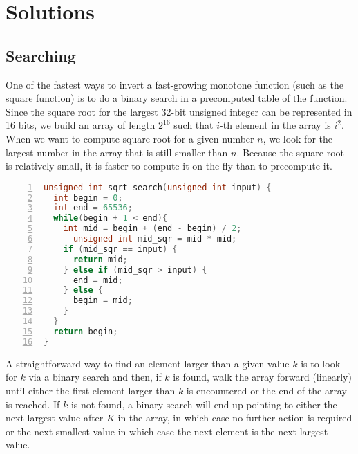 \part{Solutions}
\setcounter{chapter}{0}

{
\renewcommand{\chaptermark}[1]{
\ifthenelse{\boolean{kindle1}}{\makeoddhead{kindle1page}{\scriptsize{Ch.~\arabic{chapter}}}{\scriptsize \em Solutions}{\scriptsize #1} }{}
}
}


\chapter{ Searching}\normalsize


One of the fastest ways to invert a fast-growing monotone function (such as the square function) 
is to do a binary search in a precomputed table of the function. 
Since the square root for the largest 32-bit unsigned integer can be represented in 16 bits, we build an array of
length $2^{16}$ such that $i$-th element in the array is $i^2$. When
we want to compute square root for a given number $n$, we look for the
largest number in the array that is still smaller than $n$.  Because
the square root is relatively small, it is faster to compute it on the fly
than to precompute it.
\begin{lstlisting}[basicstyle=\footnotesize,numbers=left,breaklines=true,language=C++]
unsigned int sqrt_search(unsigned int input) {
  int begin = 0;
  int end = 65536;
  while(begin + 1 < end){
    int mid = begin + (end - begin) / 2;
      unsigned int mid_sqr = mid * mid;
    if (mid_sqr == input) {
      return mid;
    } else if (mid_sqr > input) {
      end = mid;
    } else {
      begin = mid;
    }
  }
  return begin;
}
\end{lstlisting}



A straightforward way to find an element larger than 
a given value $k$ is to look for $k$ via a 
binary search and then, if $k$ is found, walk the array 
forward (linearly) until either the first element 
larger than $k$ is encountered or the end of the array is reached. 
If $k$ is not found, a binary search will end up pointing to 
either the next largest value after $K$ in the array, in which case no further action is required or the 
next smallest value in which case the next element is the next largest value.

